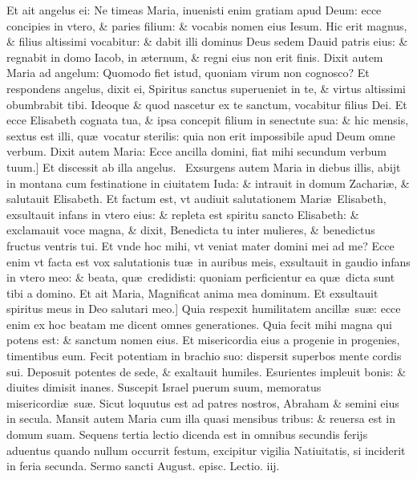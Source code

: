 \documentclass[a5paper,10pt]{book}
\def\ae{æ}
\begin{document}
\begin{multicols*}{2}
Et ait angelus ei: Ne timeas Maria, inuenisti enim gratiam apud Deum: ecce concipies in vtero, \& paries filium: \& vocabis nomen eius Iesum.
Hic erit magnus, \& filius altissimi vocabitur: \& dabit illi dominus Deus sedem Dauid patris eius: \& regnabit in domo Iacob, in \ae ternum, \& regni eius non erit finis.
Dixit autem Maria ad angelum: Quomodo fiet istud, quoniam virum non cognosco?
Et respondens angelus, dixit ei, Spiritus sanctus superueniet in te, \& virtus altissimi obumbrabit tibi.
Ideoque \& quod nascetur ex te sanctum, vocabitur filius Dei.
Et ecce Elisabeth cognata tua, \& ipsa concepit filium in senectute sua: \& hic mensis, sextus est illi, qu\ae \ vocatur sterilis: quia non erit impossibile apud Deum omne verbum.
Dixit autem Maria: Ecce ancilla domini, fiat mihi secundum verbum tuum.]
Et discessit ab illa angelus. \textdagger \ 
Exsurgens autem Maria in diebus illis, abijt in montana cum festinatione in ciuitatem Iuda: \& intrauit in domum Zachari\ae , \& salutauit Elisabeth.
Et factum est, vt audiuit salutationem Mari\ae \ Elisabeth, exsultauit infans in vtero eius: \& repleta est spiritu sancto Elisabeth: \& exclamauit voce magna, \& dixit, Benedicta tu inter mulieres, \& benedictus fructus ventris tui.
Et vnde hoc mihi, vt veniat mater domini mei ad me?
Ecce enim vt facta est vox salutationis tu\ae \ in auribus meis, exsultauit in gaudio infans in vtero meo: \& beata, qu\ae \ credidisti: quoniam perficientur ea qu\ae \ dicta sunt tibi a domino.
Et ait Maria, Magnificat anima mea dominum.
Et exsultauit spiritus meus in Deo salutari meo.]
Quia respexit humilitatem ancill\ae \ su\ae : ecce enim ex hoc beatam me dicent omnes generationes.
Quia fecit mihi magna qui potens est: \& sanctum nomen eius.
Et misericordia eius a progenie in progenies, timentibus eum.
Fecit potentiam in brachio suo: dispersit superbos mente cordis sui.
Deposuit potentes de sede, \& exaltauit humiles.
Esurientes impleuit bonis: \& diuites dimisit inanes.
Suscepit Israel puerum suum, memoratus misericordi\ae \ su\ae .
Sicut loquutus est ad patres nostros, Abraham \& semini eius in secula.
Mansit autem Maria cum illa quasi mensibus tribus: \& reuersa est in domum suam.
\newline {} \color{red} Sequens tertia lectio dicenda est in omnibus secundis ferijs aduentus quando nullum occurrit festum, excipitur vigilia Natiuitatis, si inciderit in feria secunda. \color{black}
\newline \color{red} Sermo sancti August. episc. Lectio. iij. \color{black}

\end{multicols*}
\end{document}
